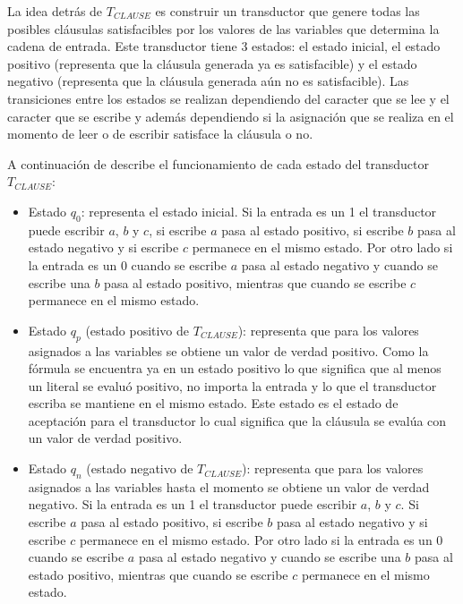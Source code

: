 \documentclass[12pt]{article}
\begin{document}
La idea detrás de $T_{CLAUSE}$ es construir un transductor que genere todas las posibles cláusulas satisfacibles 
por los valores de las variables que determina la cadena de entrada. Este transductor tiene 3 estados: el 
estado inicial, el estado positivo (representa que la cláusula generada ya es satisfacible) y el estado 
negativo (representa que la cláusula generada aún no es satisfacible). Las transiciones entre los estados 
se realizan dependiendo del caracter que se lee y el caracter que se escribe y además dependiendo si la asignación
que se realiza en el momento de leer o de escribir satisface la cláusula o no.

A continuación de describe el funcionamiento de cada estado del transductor $T_{CLAUSE}$:
\begin{itemize}
    \item Estado $q_0$: representa el estado inicial. Si la entrada es un 1 el transductor puede escribir $a$,
          $b$ y $c$, si escribe $a$ pasa al estado positivo, si escribe $b$ pasa al estado negativo y si escribe $c$
          permanece en el mismo estado. Por otro lado si la entrada es un 0 cuando se escribe $a$ pasa al estado 
          negativo y cuando se escribe una $b$ pasa al estado positivo, mientras que cuando se escribe $c$
          permanece en el mismo estado.
          
    \item Estado $q_p$ (estado positivo de $T_{CLAUSE}$): representa que para los valores asignados a las
          variables se obtiene un valor de verdad positivo.  Como la fórmula se encuentra ya en un estado positivo 
          lo que significa que al menos un literal se evaluó positivo, no importa la entrada y lo que el transductor 
          escriba se mantiene en el mismo estado. Este estado es el estado de aceptación para el transductor lo cual 
          significa que la cláusula se evalúa con un valor de verdad positivo.
          
    \item Estado $q_n$ (estado negativo de $T_{CLAUSE}$): representa que para los valores asignados a las variables
          hasta el momento se obtiene un valor de verdad negativo. Si la entrada es un 1 el transductor puede 
          escribir $a$, $b$ y $c$. Si escribe $a$ pasa al estado positivo, si escribe $b$ pasa al estado negativo y 
          si escribe $c$ permanece en el mismo estado. Por otro lado si la entrada es un 0 cuando se escribe $a$ pasa 
          al estado negativo y cuando se escribe una $b$ pasa al estado positivo, mientras que cuando se escribe $c$
          permanece en el mismo estado.
          
\end{itemize}
\end{document}
